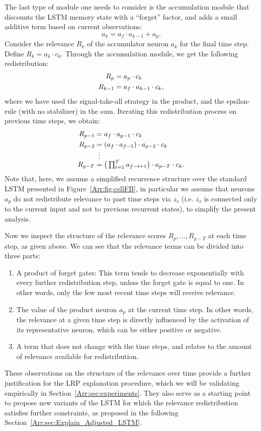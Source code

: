 \documentclass[runningheads]{llncs}
\begin{document}
The last type of module one needs to consider is the accumulation module that discounts the LSTM memory state with a ``forget'' factor, and adds a small additive term based on current observations:
$$
a_k = a_f \cdot a_{k-1} + a_p.
$$
Consider the relevance $R_k$ of the accumulator neuron $a_k$ for the final time step. Define $R_k = a_k \cdot c_k$. 
Through the accumulation module, we get the following redistribution:
\begin{align*}
\allowdisplaybreaks
R_{p} &= a_p \cdot c_{k} \\
R_{k-1} &= a_f \cdot a_{k-1} \cdot c_{k},
\end{align*}
where we have used the signal-take-all strategy in the product, and the epsilon-rule (with no stabilizer) in the sum.
Iterating this redistribution process on previous time steps, we obtain:
\begin{align*}
\allowdisplaybreaks
R_{p-1} &= a_f \cdot a_{p-1} \cdot c_k\\
R_{p-2} &= (a_f \cdot a_{f-1}) \cdot a_{p-2} \cdot c_k\\[-2mm]
&~\,\vdots\\[-2mm]
R_{p-T} &= \textstyle \big(\prod_{t=1}^T a_{f-t+1}\big) \cdot a_{p-T} \cdot c_k.
\end{align*}
Note that, here, we assume a simplified recurrence structure over the standard LSTM presented in Figure~\ref{Arr:fig:cellFB}, in particular we assume that neurons $a_p$ do not redistribute relevance to past time steps via $z_s$ (i.e. $z_s$ is connected only to the current input and not to previous recurrent states), to simplify the present analysis.

Now we inspect the structure of the relevance scores $R_p,\dots,R_{p-T}$ at each time step, as given above. We can see that the relevance terms can be divided into three parts:
\begin{enumerate}
\item A product of forget gates: This term tends to decrease exponentially with every further redistribution step, unless the forget gate is equal to one. In other words, only the few most recent time steps will receive relevance.
\item The value of the product neuron  $a_p$ at the current time step. In other words, the relevance at a given time step is directly influenced by the activation of its representative neuron, which can be either positive or negative.
\item A term that does not change with the time steps, and relates to the amount of relevance available for redistribution.
\end{enumerate}
These observations on the structure of the relevance over time provide a further justification for the LRP explanation procedure, which we will be validating empirically in Section~\ref{Arr:sec:experiments}. 
They also serve as a starting point to propose new variants of the LSTM for which the relevance redistribution satisfies further constraints, as proposed in the following Section~\ref{Arr:sec:Explain_Adjusted_LSTM}.
\end{document}

